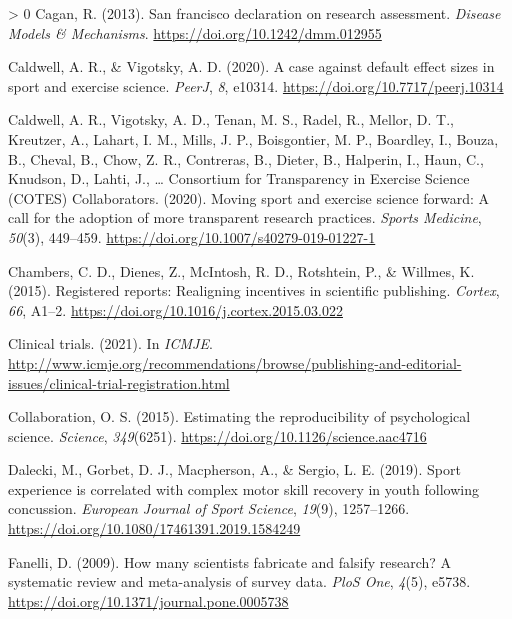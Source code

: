 \documentclass[]{cik}%
\newlength{\cslhangindent}
\newenvironment{CSLReferences}[3] %
 {%
  \setlength{\parindent}{0pt}
  \ifodd #1 \everypar{\setlength{\hangindent}{\cslhangindent}}\ignorespaces\fi
  \ifnum #2 > 0
  \setlength{\parskip}{#2\baselineskip}
  \fi
 }%
 {}
\begin{document}
\begin{CSLReferences}{1}{0}
\leavevmode\hypertarget{ref-DORA2013}{}%
Cagan, R. (2013). San francisco declaration on research assessment.
\emph{Disease Models {\&} Mechanisms}.
\url{https://doi.org/10.1242/dmm.012955}

\leavevmode\hypertarget{ref-Caldwell_Vigotsky_2020}{}%
Caldwell, A. R., \& Vigotsky, A. D. (2020). A case against default
effect sizes in sport and exercise science. \emph{PeerJ}, \emph{8},
e10314. \url{https://doi.org/10.7717/peerj.10314}

\leavevmode\hypertarget{ref-caldwell_moving_2020}{}%
Caldwell, A. R., Vigotsky, A. D., Tenan, M. S., Radel, R., Mellor, D.
T., Kreutzer, A., Lahart, I. M., Mills, J. P., Boisgontier, M. P.,
Boardley, I., Bouza, B., Cheval, B., Chow, Z. R., Contreras, B., Dieter,
B., Halperin, I., Haun, C., Knudson, D., Lahti, J., \ldots{} Consortium
for Transparency in Exercise Science (COTES) Collaborators. (2020).
Moving sport and exercise science forward: A call for the adoption of
more transparent research practices. \emph{Sports Medicine},
\emph{50}(3), 449--459. \url{https://doi.org/10.1007/s40279-019-01227-1}

\leavevmode\hypertarget{ref-chambers_registered_2015}{}%
Chambers, C. D., Dienes, Z., McIntosh, R. D., Rotshtein, P., \& Willmes,
K. (2015). Registered reports: Realigning incentives in scientific
publishing. \emph{Cortex}, \emph{66}, A1--2.
\url{https://doi.org/10.1016/j.cortex.2015.03.022}

\leavevmode\hypertarget{ref-icmje}{}%
Clinical trials. (2021). In \emph{ICMJE}.
\url{http://www.icmje.org/recommendations/browse/publishing-and-editorial-issues/clinical-trial-registration.html}

\leavevmode\hypertarget{ref-collaboration_estimating_2015}{}%
Collaboration, O. S. (2015). Estimating the reproducibility of
psychological science. \emph{Science}, \emph{349}(6251).
\url{https://doi.org/10.1126/science.aac4716}

\leavevmode\hypertarget{ref-Dalecki2019}{}%
Dalecki, M., Gorbet, D. J., Macpherson, A., \& Sergio, L. E. (2019).
Sport experience is correlated with complex motor skill recovery in
youth following concussion. \emph{European Journal of Sport Science},
\emph{19}(9), 1257--1266.
\url{https://doi.org/10.1080/17461391.2019.1584249}

\leavevmode\hypertarget{ref-fanelli_how_2009}{}%
Fanelli, D. (2009). How many scientists fabricate and falsify research?
{A} systematic review and meta-analysis of survey data. \emph{PloS One},
\emph{4}(5), e5738. \url{https://doi.org/10.1371/journal.pone.0005738}


\end{CSLReferences}
\end{document}

